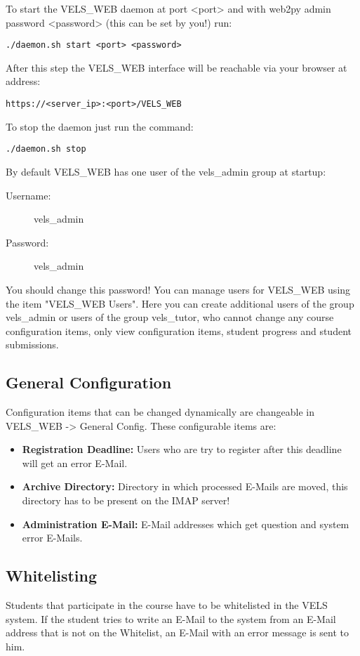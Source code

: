 To start the VELS\_WEB daemon at port <port> and with web2py admin password
<password> (this can be set by you!) run:
\begin{verbatim}
./daemon.sh start <port> <password>
\end{verbatim}

After this step the VELS\_WEB interface will be reachable via your browser at
address:
\begin{verbatim}
https://<server_ip>:<port>/VELS_WEB
\end{verbatim}

To stop the daemon just run the command:

\begin{verbatim}
./daemon.sh stop
\end{verbatim}

By default VELS\_WEB has one user of the vels\_admin group at startup:
\begin{description}
\item [Username:] vels\_admin
\item [Password:] vels\_admin
\end{description}
You should change this password! You can manage users for VELS\_WEB using the item
"VELS\_WEB Users". Here you can create additional users of the group
vels\_admin or users of the group vels\_tutor, who cannot change any course
configuration items, only view configuration items, student progress and student
submissions.

\subsection{General Configuration}\label{sub:generalconfig}
Configuration items that can be changed dynamically are changeable in VELS\_WEB ->
General Config. These configurable items are:
\begin{itemize}
\item {\bf Registration Deadline:} Users who are try to register after this deadline will
    get an error E-Mail.
\item {\bf Archive Directory:} Directory in which processed E-Mails are moved, this
    directory has to be present on the IMAP server!
\item {\bf Administration E-Mail:} E-Mail addresses which get question and system error E-Mails.

\end{itemize}

\subsection{Whitelisting} \label{sub:whitelisting}
Students that participate in the course have to be whitelisted in the VELS system. If the student
tries to write an E-Mail to the system from an E-Mail address that is not on the Whitelist, an E-Mail
with an error message is sent to him.

